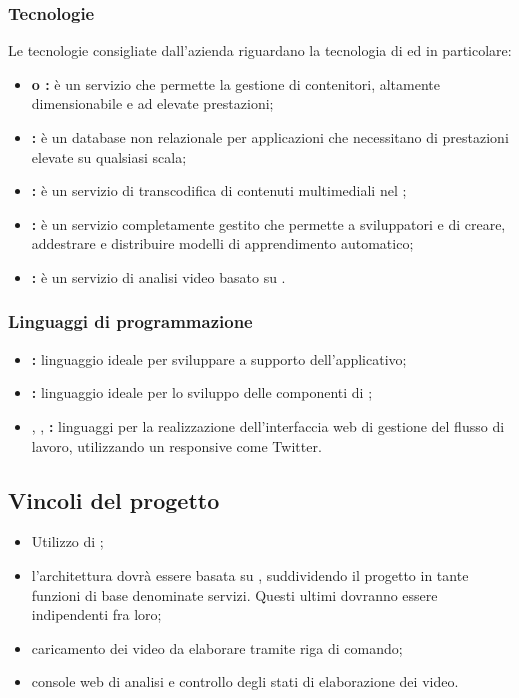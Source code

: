     \subsubsection{Tecnologie}
    Le tecnologie consigliate dall'azienda riguardano la tecnologia di  ed in particolare:
    \begin{itemize}
        \item \textbf{ o : }è un servizio che permette la gestione di contenitori, altamente dimensionabile e ad elevate prestazioni;
        \item \textbf{: }è un database non relazionale per applicazioni che necessitano di prestazioni elevate su qualsiasi scala;
        \item \textbf{: }è un servizio di transcodifica di contenuti multimediali nel ;
        \item \textbf{: }è un servizio completamente gestito che permette a sviluppatori e  di creare, addestrare e distribuire modelli di apprendimento automatico;
        \item \textbf{: }è un servizio di analisi video basato su .
    \end{itemize}
        \subsubsection{Linguaggi di programmazione}
        \begin{itemize}
            \item \textbf{: }linguaggio ideale per sviluppare   a supporto dell'applicativo;
            \item \textbf{: }linguaggio ideale per lo sviluppo delle componenti di ;
            \item \textbf{}, \textbf{}, \textbf{: }linguaggi per la realizzazione dell'interfaccia web di gestione del flusso di lavoro, utilizzando un  responsive come Twitter.
        \end{itemize}
    \subsection{Vincoli del progetto}
    \begin{itemize}
        \item Utilizzo di ;
        \item l'architettura dovrà essere basata su , suddividendo il progetto in tante funzioni di base denominate servizi. Questi ultimi dovranno essere indipendenti fra loro;
        \item caricamento dei video da elaborare tramite riga di comando;
        \item console web di analisi e controllo degli stati di elaborazione dei video.
      \end{itemize}

